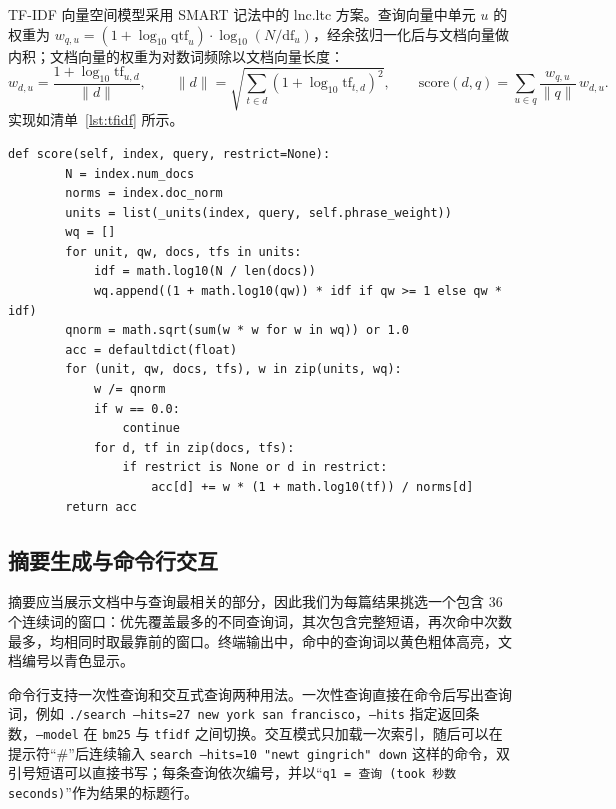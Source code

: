\documentclass[12pt,a4paper]{ctexart}
\begin{document}
TF-IDF 向量空间模型采用 SMART 记法中的 lnc.ltc 方案。查询向量中单元 $u$ 的权重为 $w_{q,u} = (1 + \log_{10}\mathrm{qtf}_u)\cdot\log_{10}(N/\mathrm{df}_u)$，经余弦归一化后与文档向量做内积；文档向量的权重为对数词频除以文档向量长度：
\begin{equation}
w_{d,u} = \frac{1 + \log_{10}\mathrm{tf}_{u,d}}{\lVert d \rVert},
\qquad
\lVert d \rVert = \sqrt{\sum_{t \in d} \left(1 + \log_{10}\mathrm{tf}_{t,d}\right)^2},
\qquad
\mathrm{score}(d, q) = \sum_{u \in q} \frac{w_{q,u}}{\lVert q \rVert}\, w_{d,u}.
\label{eq:tfidf}
\end{equation}
实现如清单~\ref{lst:tfidf} 所示。

\begin{lstlisting}[caption={TF-IDF（lnc.ltc）打分}, label={lst:tfidf}, gobble=4]
    def score(self, index, query, restrict=None):
        N = index.num_docs
        norms = index.doc_norm
        units = list(_units(index, query, self.phrase_weight))
        wq = []
        for unit, qw, docs, tfs in units:
            idf = math.log10(N / len(docs))
            wq.append((1 + math.log10(qw)) * idf if qw >= 1 else qw * idf)
        qnorm = math.sqrt(sum(w * w for w in wq)) or 1.0
        acc = defaultdict(float)
        for (unit, qw, docs, tfs), w in zip(units, wq):
            w /= qnorm
            if w == 0.0:
                continue
            for d, tf in zip(docs, tfs):
                if restrict is None or d in restrict:
                    acc[d] += w * (1 + math.log10(tf)) / norms[d]
        return acc
\end{lstlisting}

\subsection{摘要生成与命令行交互}

摘要应当展示文档中与查询最相关的部分，因此我们为每篇结果挑选一个包含 36 个连续词的窗口：优先覆盖最多的不同查询词，其次包含完整短语，再次命中次数最多，均相同时取最靠前的窗口。终端输出中，命中的查询词以黄色粗体高亮，文档编号以青色显示。

命令行支持一次性查询和交互式查询两种用法。一次性查询直接在命令后写出查询词，例如 \texttt{./search --hits=27 new york san francisco}，\texttt{--hits} 指定返回条数，\texttt{--model} 在 \texttt{bm25} 与 \texttt{tfidf} 之间切换。交互模式只加载一次索引，随后可以在提示符“\#”后连续输入 \texttt{search --hits=10 "newt gingrich" down} 这样的命令，双引号短语可以直接书写；每条查询依次编号，并以“\texttt{q1 = 查询 (took 秒数 seconds)}”作为结果的标题行。
\end{document}

